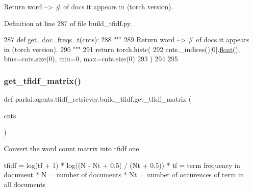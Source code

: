 \begin{DoxyVerb}Return word --> # of docs it appears in (torch version).
\end{DoxyVerb}
 

Definition at line 287 of file build\+\_\+tfidf.\+py.


\begin{DoxyCode}
287 \textcolor{keyword}{def }\hyperlink{namespaceparlai_1_1agents_1_1tfidf__retriever_1_1build__tfidf_a284d006ecb031c337c64d7debe1407d3}{get\_doc\_freqs\_t}(cnts):
288     \textcolor{stringliteral}{"""}
289 \textcolor{stringliteral}{    Return word --> # of docs it appears in (torch version).}
290 \textcolor{stringliteral}{    """}
291     \textcolor{keywordflow}{return} torch.histc(
292         cnts.\_indices()[0].\hyperlink{namespaceprojects_1_1controllable__dialogue_1_1make__control__dataset_aa2b7207688c641dbc094ab44eca27113}{float}(), bins=cnts.size(0), min=0, max=cnts.size(0)
293     )
294 
295 
\end{DoxyCode}
\mbox{\label{namespaceparlai_1_1agents_1_1tfidf__retriever_1_1build__tfidf_acce651a5b40c5a3b4009181f22c69eaa}} 
\subsubsection{\texorpdfstring{get\+\_\+tfidf\+\_\+matrix()}{get\_tfidf\_matrix()}}
{\footnotesize\ttfamily def parlai.\+agents.\+tfidf\+\_\+retriever.\+build\+\_\+tfidf.\+get\+\_\+tfidf\+\_\+matrix (\begin{DoxyParamCaption}\item[{}]{cnts }\end{DoxyParamCaption})}

\begin{DoxyVerb}Convert the word count matrix into tfidf one.

tfidf = log(tf + 1) * log((N - Nt + 0.5) / (Nt + 0.5))
* tf = term frequency in document
* N = number of documents
* Nt = number of occurences of term in all documents
\end{DoxyVerb}
 

